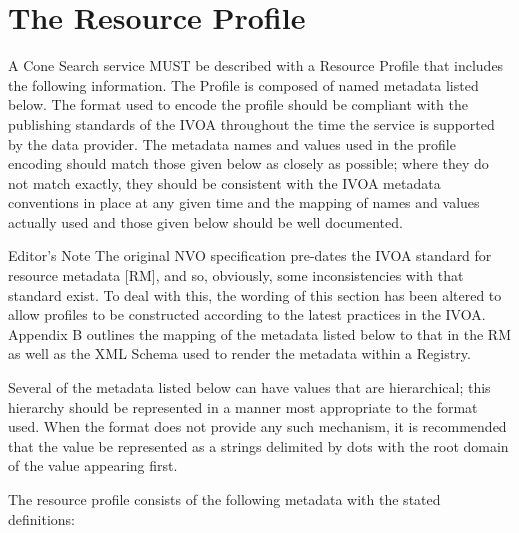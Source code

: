 \documentclass[11pt,a4paper]{ivoa}
\begin{document}
\section{The Resource Profile}
\label{sec:3} 

A Cone Search service MUST
be described with a Resource Profile that includes the following
information. The Profile is composed of named metadata listed below. The
format used to encode the profile should be compliant with the
publishing standards of the IVOA throughout the time the service is
supported by the data provider. The metadata names and values used in
the profile encoding should match those given below as closely as
possible; where they do not match exactly, they should be consistent
with the IVOA metadata conventions in place at any given time and the
mapping of names and values actually used and those given below should
be well documented.

\begin{bigdescription}
	\item[Editor's Note] 
		The original NVO specification pre-dates the IVOA standard for resource
		metadata [RM], and so, obviously, some inconsistencies with that
		standard exist. To deal with this, the wording of this section has been
		altered to allow profiles to be constructed according to the latest
		practices in the IVOA. Appendix B outlines the mapping of the metadata
		listed below to that in the RM as well as the XML Schema used to render
		the metadata within a Registry.
\end{bigdescription}

Several of the
metadata listed below can have values that are hierarchical; this
hierarchy should be represented in a manner most appropriate to the
format used. When the format does not provide any such mechanism, it is
recommended that the value be represented as a strings delimited by dots
with the root domain of the value appearing first.

The resource profile consists of the following metadata with the stated
definitions:
\end{document}
